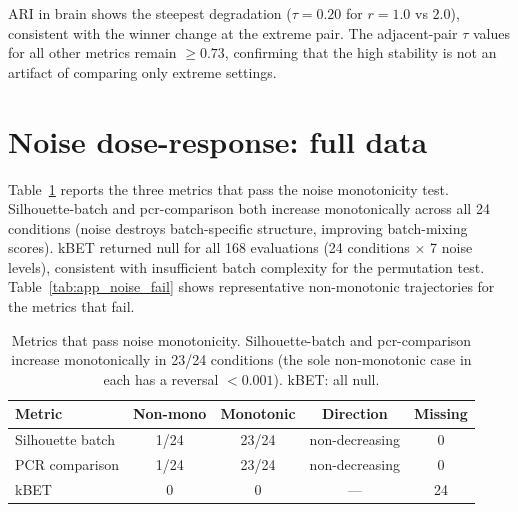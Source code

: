 \documentclass[9pt,lineno]{elife}
\begin{document}
ARI in brain shows the steepest degradation ($\tau = 0.20$ for $r = 1.0$ vs $2.0$), consistent with the winner change at the extreme pair. The adjacent-pair $\tau$ values for all other metrics remain $\geq 0.73$, confirming that the high stability is not an artifact of comparing only extreme settings.


\section{Noise dose-response: full data}
\label{app:noise}

Table~\ref{tab:app_noise_pass} reports the three metrics that pass the noise monotonicity test. Silhouette-batch and pcr-comparison both increase monotonically across all 24 conditions (noise destroys batch-specific structure, improving batch-mixing scores). kBET returned null for all 168 evaluations (24 conditions $\times$ 7 noise levels), consistent with insufficient batch complexity for the permutation test. Table~\ref{tab:app_noise_fail} shows representative non-monotonic trajectories for the metrics that fail.

\begin{table}[h!]
\centering
\caption{Metrics that pass noise monotonicity. Silhouette-batch and pcr-comparison increase monotonically in 23/24 conditions (the sole non-monotonic case in each has a reversal $< 0.001$). kBET: all null.}
\label{tab:app_noise_pass}
\small
\begin{tabular}{@{}lcccc@{}}
\toprule
Metric & Non-mono & Monotonic & Direction & Missing \\
\midrule
Silhouette batch & 1/24 & 23/24 & non-decreasing & 0 \\
PCR comparison   & 1/24 & 23/24 & non-decreasing & 0 \\
kBET             & 0    & 0     & ---            & 24 \\
\bottomrule
\end{tabular}
\end{table}
\end{document}

